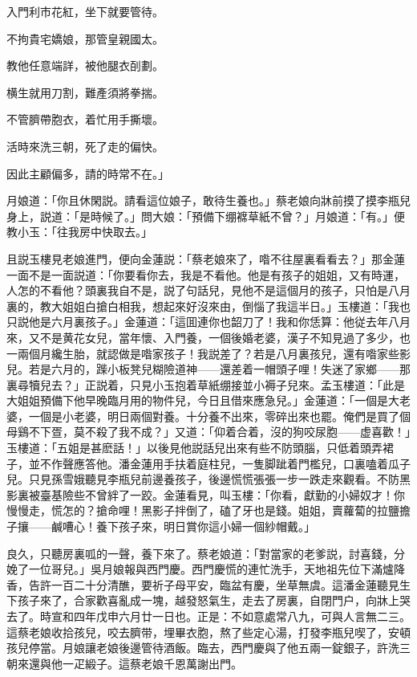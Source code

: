 入門利市花紅，坐下就要管待。

不拘貴宅嬌娘，那管皇親國太。

教他任意端詳，被他腿衣㓦劃。

横生就用刀割，難產須將拳揣。

不管臍帶胞衣，着忙用手撕壞。

活時來洗三朝，死了走的偏快。

因此主顧偏多，請的時常不在。」

月娘道：「你且休閑説。請看這位娘子，敢待生養也。」蔡老娘向牀前摸了摸李瓶兒身上，説道：「是時候了。」問大娘：「預備下绷褯草紙不曾？」月娘道：「有。」便教小玉：「往我房中快取去。」

且説玉樓見老娘進門，便向金蓮説：「蔡老娘來了，喒不往屋裏看看去？」那金蓮一面不是一面説道：「你要看你去，我是不看他。他是有孩子的姐姐，又有時運，人怎的不看他？頭裏我自不是，説了句話兒，見他不是這個月的孩子，只怕是八月裏的，教大姐姐白搶白相我，想起來好沒來由，倒惱了我這半日。」玉樓道：「我也只説他是六月裏孩子。」金蓮道：「這囬連你也韶刀了！我和你恁算：他従去年八月來，又不是黄花女兒，當年懷、入門養，一個後婚老婆，漢子不知見過了多少，也一兩個月纔生胎，就認做是喒家孩子！我説差了？若是八月裏孩兒，還有喒家些影兒。若是六月的，䠕小板凳兒糊險道神——還差着一帽頭子哩！失迷了家鄉——那裏尋犢兒去？」正説着，只見小玉抱着草紙绷接並小褥子兒來。孟玉樓道：「此是大姐姐預備下他早晚臨月用的物件兒，今日且借來應急兒。」金蓮道：「一個是大老婆，一個是小老婆，明日兩個對養。十分養不出來，零碎出來也罷。俺們是買了個母鷄不下疍，莫不殺了我不成？」又道：「仰着合着，沒的狗咬尿胞——虚喜歡！」玉樓道：「五姐是甚麽話！」以後見他説話兒出來有些不防頭腦，只低着頭弄裙子，並不作聲應答他。潘金蓮用手扶着庭柱兒，一隻脚跐着門檻兒，口裏嗑着瓜子兒。只見孫雪娥聽見李瓶兒前邊養孩子，後邊慌慌張張一步一跌走來觀看。不防黑影裏被臺基險些不曾絆了一跤。金蓮看見，叫玉樓：「你看，獻勤的小婦奴才！你慢慢走，慌怎的？搶命哩！黑影子拌倒了，磕了牙也是錢。姐姐，賣蘿蔔的拉鹽擔子攘——鹹嘈心！養下孩子來，明日賞你這小婦一個紗帽戴。」

良久，只聽房裏呱的一聲，養下來了。蔡老娘道：「對當家的老爹説，討喜錢，分娩了一位哥兒。」吳月娘報與西門慶。西門慶慌的連忙洗手，天地祖先位下滿爐降香，告許一百二十分清醮，要祈子母平安，臨盆有慶，坐草無虞。這潘金蓮聽見生下孩子來了，合家歡喜亂成一塊，越發怒氣生，走去了房裏，自閉門户，向牀上哭去了。時宣和四年戊申六月廿一日也。正是：不如意處常八九，可與人言無二三。這蔡老娘收拾孩兒，咬去臍带，埋畢衣胞，熬了些定心湯，打發李瓶兒喫了，安頓孩兒停當。月娘讓老娘後邊管待酒飯。臨去，西門慶與了他五兩一錠銀子，許洗三朝來還與他一疋緞子。這蔡老娘千恩萬謝出門。

